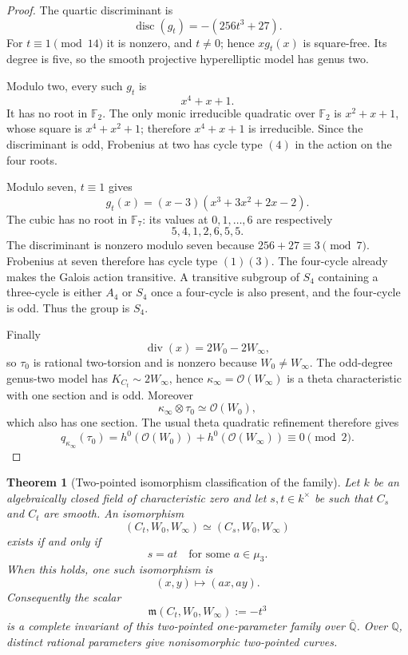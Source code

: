 \documentclass[11pt]{article}
\newtheorem{theorem}{Theorem}[section]
\theoremstyle{definition}
\theoremstyle{remark}
\begin{document}
\begin{proof}
The quartic discriminant is
\begin{equation}
 \operatorname{disc}(g_t)=-(256t^3+27).
 \label{eq:v13-quartic-discriminant}
\end{equation}
For $t\equiv1\pmod{14}$ it is nonzero, and $t\ne0$; hence
$xg_t(x)$ is square-free.  Its degree is five, so the smooth projective
hyperelliptic model has genus two.

Modulo two, every such $g_t$ is
\[
 x^4+x+1.
\]
It has no root in $\mathbb F_2$.  The only monic irreducible quadratic over
$\mathbb F_2$ is $x^2+x+1$, whose square is $x^4+x^2+1$; therefore
$x^4+x+1$ is irreducible.  Since the discriminant is odd, Frobenius at two
has cycle type $(4)$ in the action on the four roots.

Modulo seven, $t\equiv1$ gives
\[
 g_t(x)=(x-3)(x^3+3x^2+2x-2).
\]
The cubic has no root in $\mathbb F_7$: its values at
$0,1,\ldots,6$ are respectively
\[
 5,4,1,2,6,5,5.
\]
The discriminant is nonzero modulo seven because
$256+27\equiv3\pmod7$.  Frobenius at seven therefore has cycle type $(1)(3)$.
The four-cycle already makes the Galois action transitive.  A transitive
subgroup of $S_4$ containing a three-cycle is either $A_4$ or $S_4$ once a
four-cycle is also present, and the four-cycle is odd.  Thus the group is
$S_4$.

Finally
\[
 \operatorname{div}(x)=2W_0-2W_\infty,
\]
so $\tau_0$ is rational two-torsion and is nonzero because $W_0\ne W_\infty$.
The odd-degree genus-two model has
$K_{C_t}\sim2W_\infty$, hence
$\kappa_\infty=\mathcal O(W_\infty)$ is a theta characteristic with one
section and is odd.  Moreover
\[
 \kappa_\infty\otimes\tau_0\simeq\mathcal O(W_0),
\]
which also has one section.  The usual theta quadratic refinement therefore
gives
\[
 q_{\kappa_\infty}(\tau_0)
 =h^0(\mathcal O(W_0))+h^0(\mathcal O(W_\infty))
 \equiv0\pmod2.
\]
\end{proof}

\begin{theorem}[Two-pointed isomorphism classification of the family]
\label{thm:v13-family-isom}
Let $k$ be an algebraically closed field of characteristic zero and let
$s,t\in k^\times$ be such that $C_s$ and $C_t$ are smooth.  An isomorphism
\[
 (C_t,W_0,W_\infty)\simeq(C_s,W_0,W_\infty)
\]
exists if and only if
\begin{equation}
 \boxed{s=a t\quad\text{for some }a\in\mu_3.}
 \label{eq:v13-isom-classification}
\end{equation}
When this holds, one such isomorphism is
\begin{equation}
 (x,y)\longmapsto(ax,ay).
 \label{eq:v13-explicit-isom}
\end{equation}
Consequently the scalar
\begin{equation}
 \boxed{\mathfrak m(C_t,W_0,W_\infty):=-t^3}
 \label{eq:v13-moduli-scalar}
\end{equation}
is a complete invariant of this two-pointed one-parameter family over
$\overline{\mathbb Q}$.  Over $\mathbb Q$, distinct rational parameters give
nonisomorphic two-pointed curves.
\end{theorem}
\end{document}
